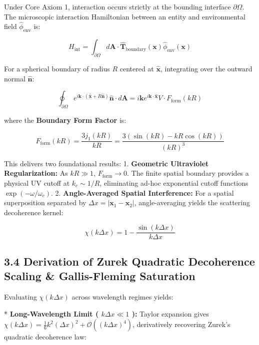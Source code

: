 \documentclass[11pt,a4paper]{article}
\theoremstyle{definition}\newtheorem{definition}{Definition}
\theoremstyle{remark}\newtheorem{remark}{Remark}
\begin{document}
Under Core Axiom 1, interaction occurs strictly at the bounding interface $\partial\Omega$. The microscopic interaction Hamiltonian between an entity and environmental field $\hat{\phi}_{\text{env}}$ is:


\begin{equation}
H_{\text{int}} = \int_{\partial \Omega} d\mathbf{A} \cdot \hat{\mathbf{T}}_{\text{boundary}}(\mathbf{x}) \hat{\phi}_{\text{env}}(\mathbf{x})
\end{equation}


For a spherical boundary of radius $R$ centered at $\hat{\mathbf{x}}$, integrating over the outward normal $\hat{\mathbf{n}}$:


\begin{equation}
\oint_{\partial \Omega} e^{i \mathbf{k} \cdot (\hat{\mathbf{x}} + R \hat{\mathbf{n}})} \hat{\mathbf{n}} \cdot d\mathbf{A} = i \mathbf{k} e^{i \mathbf{k} \cdot \hat{\mathbf{x}}} V \cdot F_{\text{form}}(k R)
\end{equation}


where the \textbf{Boundary Form Factor} is:


\begin{equation}
F_{\text{form}}(k R) = \frac{3 j_1(k R)}{k R} = \frac{3 (\sin(k R) - k R \cos(k R))}{(k R)^3}
\end{equation}


This delivers two foundational results:
1. \textbf{Geometric Ultraviolet Regularization:} As $k R \gg 1$, $F_{\text{form}} \to 0$. The finite spatial boundary provides a physical UV cutoff at $k_c \sim 1/R$, eliminating ad-hoc exponential cutoff functions $\exp(-\omega/\omega_c)$.
2. \textbf{Angle-Averaged Spatial Interference:} For a spatial superposition separated by $\Delta x = |\mathbf{x}_1 - \mathbf{x}_2|$, angle-averaging yields the scattering decoherence kernel:


\begin{equation}
\chi(k \Delta x) = 1 - \frac{\sin(k \Delta x)}{k \Delta x}
\end{equation}

\subsection{3.4 Derivation of Zurek Quadratic Decoherence Scaling \& Gallis-Fleming Saturation}

Evaluating $\chi(k \Delta x)$ across wavelength regimes yields:

* \textbf{Long-Wavelength Limit ( $k \Delta x \ll 1$ ):} Taylor expansion gives $\chi(k \Delta x) = \frac{1}{6} k^2 (\Delta x)^2 + \mathcal{O}((k \Delta x)^4)$, derivatively recovering Zurek's quadratic decoherence law:
\end{document}
